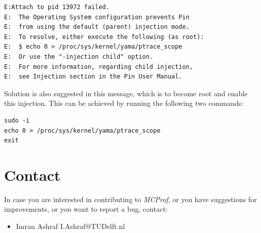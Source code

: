 \documentclass[10pt]{article}
\newcommand{\MCPROF}{\emph{MCProf}}
\begin{document}
{
\small
\begin{Verbatim}[frame=single, samepage=true]
E:Attach to pid 13972 failed. 
E:  The Operating System configuration prevents Pin
E:  from using the default (parent) injection mode.
E:  To resolve, either execute the following (as root):
E:  $ echo 0 > /proc/sys/kernel/yama/ptrace_scope
E:  Or use the "-injection child" option.
E:  For more information, regarding child injection,
E:  see Injection section in the Pin User Manual.
\end{Verbatim}
}

Solution is also suggested in this message, which is to become root and enable
this injection. This can be achieved by running the following two commands:

{
\small
\begin{Verbatim}[frame=single, samepage=true]
sudo -i
echo 0 > /proc/sys/kernel/yama/ptrace_scope
exit
\end{Verbatim}
}


\section{Contact}
\label{sec:contact}

In case you are interested in contributing to \MCPROF{}, or you have suggestions
for improvements, or you want to report a bug, contact:

\begin{itemize}
\item Imran Ashraf \textlangle I.Ashraf@TUDelft.nl \textrangle
\end{itemize}




\end{document}
